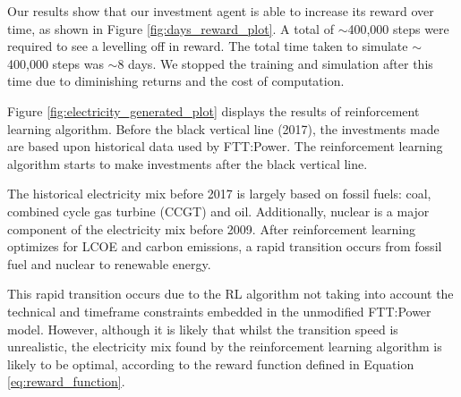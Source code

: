 Our results show that our investment agent is able to increase its reward over time, as shown in Figure \ref{fig:days_reward_plot}. A total of ${\sim}$400,000 steps were required to see a levelling off in reward. The total time taken to simulate ${\sim}$400,000 steps was ${\sim}$8 days. We stopped the training and simulation after this time due to diminishing returns and the cost of computation.

Figure \ref{fig:electricity_generated_plot} displays the results of reinforcement learning algorithm. Before the black vertical line (2017), the investments made are based upon historical data used by FTT:Power. The reinforcement learning algorithm starts to make investments after the black vertical line. 


The historical electricity mix before 2017 is largely based on fossil fuels: coal, combined cycle gas turbine (CCGT) and oil. Additionally, nuclear is a major component of the electricity mix before 2009. After reinforcement learning optimizes for LCOE and carbon emissions, a rapid transition occurs from fossil fuel and nuclear to renewable energy. 

This rapid transition occurs due to the RL algorithm not taking into account the technical and timeframe constraints embedded in the unmodified FTT:Power model. However, although it is likely that whilst the transition speed is unrealistic, the electricity mix found by the reinforcement learning algorithm is likely to be optimal, according to the reward function defined in Equation \ref{eq:reward_function}.





